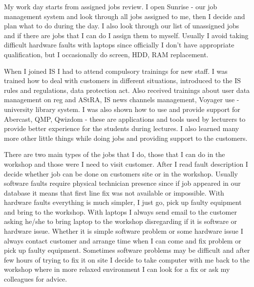 \documentclass[10pt,a4paper,headinclude=true]{report}
\begin{document}
My work day starts from assigned jobs review. I open Sunrise - our job management system and look through all jobs assigned to me, then I decide and plan what to do during the day. I also look through our list of unassigned jobs and if there are jobs that I can do I assign them to myself. Usually I avoid taking difficult hardware faults with laptops since officially I don't have appropriate qualification, but I occasionally do screen, HDD, RAM replacement.

When I joined IS I had to attend compulsory trainings for new staff. I was trained how to deal with customers in different situations, introduced to the IS rules and regulations, data protection act. Also received trainings about user data management on reg and AStRA, IS news channels management, Voyager use - university library system. I was also shown how to use and provide support for Abercast, QMP, Qwizdom - these are applications and tools used by lecturers to provide better experience for the students during lectures. I also learned many more other little things while doing jobs and providing support to the customers.

There are two main types of the jobs that I do, those that I can do in the workshop and those were I need to visit customer. After I read fault description I decide whether job can be done on customers site or in the workshop. Usually software faults require physical technician presence since if job appeared in our database it means that first line fix was not available or impossible. With hardware faults everything is much simpler, I just go, pick up faulty equipment and bring to the workshop. With laptops I always send email to the customer asking he/she to bring laptop to the workshop disregarding if it is software or hardware issue. Whether it is simple software problem or some hardware issue I always contact customer and arrange time when I can come and fix problem or pick up faulty equipment. Sometimes software problems may be difficult and after few hours of trying to fix it on site I decide to take computer with me back to the workshop where in more relaxed environment I can look for a fix or ask my colleagues for advice.
\end{document}
